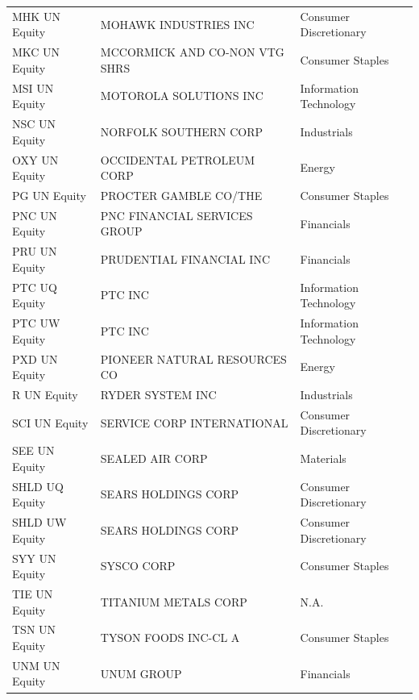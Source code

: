 \documentclass[11pt,a4,twosided,singlespacing,titlepagenumber=on]{scrreprt}
\numberwithin{equation}{chapter} %
\theoremstyle{remark}
\begin{document}
\begin{table}[H]
\begin{tabular}{lll}
MHK UN Equity & MOHAWK INDUSTRIES INC & Consumer Discretionary \\
MKC UN Equity & MCCORMICK AND CO-NON VTG SHRS & Consumer Staples \\
MSI UN Equity & MOTOROLA SOLUTIONS INC & Information Technology \\
NSC UN Equity & NORFOLK SOUTHERN CORP & Industrials \\
OXY UN Equity & OCCIDENTAL PETROLEUM CORP & Energy \\
PG UN Equity & PROCTER GAMBLE CO/THE & Consumer Staples \\
PNC UN Equity & PNC FINANCIAL SERVICES GROUP & Financials \\
PRU UN Equity & PRUDENTIAL FINANCIAL INC & Financials \\
PTC UQ Equity & PTC INC & Information Technology \\
PTC UW Equity & PTC INC & Information Technology \\
PXD UN Equity & PIONEER NATURAL RESOURCES CO & Energy \\
R UN Equity & RYDER SYSTEM INC & Industrials \\
SCI UN Equity & SERVICE CORP INTERNATIONAL & Consumer Discretionary \\
SEE UN Equity & SEALED AIR CORP & Materials \\
SHLD UQ Equity & SEARS HOLDINGS CORP & Consumer Discretionary \\
SHLD UW Equity & SEARS HOLDINGS CORP & Consumer Discretionary \\
SYY UN Equity & SYSCO CORP & Consumer Staples \\
TIE UN Equity & TITANIUM METALS CORP & N.A. \\
TSN UN Equity & TYSON FOODS INC-CL A & Consumer Staples \\
UNM UN Equity & UNUM GROUP & Financials \\
\hline
\end{tabular}
\end{table}
\end{document}
